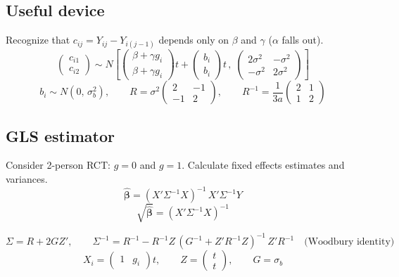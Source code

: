 \documentclass[11pt]{article}
\begin{document}
\subsection*{Useful device}

Recognize that
$c_{ij} = Y_{ij} - Y_{i(j-1)}$ depends only on
$\beta$ and $\gamma$ ($\alpha$ falls out).
\begin{equation}
  \begin{pmatrix} c_{i1} \\ c_{i2} \end{pmatrix}
  \sim N\!\left[
    \begin{pmatrix}
      \beta + \gamma g_i \\
      \beta + \gamma g_i
    \end{pmatrix} t
    + \begin{pmatrix} b_i \\ b_i \end{pmatrix} t\,,\;
    \begin{pmatrix}
      2\sigma^2 & -\sigma^2 \\
      -\sigma^2 & 2\sigma^2
    \end{pmatrix}
  \right]
\end{equation}
\[
  b_i \sim N(0,\,\sigma_b^2), \qquad
  R = \sigma^2
  \begin{pmatrix} 2 & -1 \\ -1 & 2 \end{pmatrix},
  \qquad
  R^{-1} = \frac{1}{3a}
  \begin{pmatrix} 2 & 1 \\ 1 & 2 \end{pmatrix}
\]

\subsection*{GLS estimator}

Consider 2-person RCT: $g = 0$ and $g = 1$.
Calculate fixed effects estimates and variances.
\[
  \hat{\bm{\beta}}
  = (X'\Sigma^{-1}X)^{-1}\,X'\Sigma^{-1}Y
\]
\[
  \sqrt{\hat{\bm{\beta}}} = (X'\Sigma^{-1}X)^{-1}
\]

\[
  \Sigma = R + 2GZ', \qquad
  \Sigma^{-1} = R^{-1}
    - R^{-1}Z\,(G^{-1} + Z'R^{-1}Z)^{-1}\,Z'R^{-1}
  \quad\text{(Woodbury identity)}
\]
\[
  X_i = \begin{pmatrix} 1 & g_i \end{pmatrix} t,
  \qquad
  Z = \begin{pmatrix} t \\ t \end{pmatrix},
  \qquad
  G = \sigma_b
\]
\end{document}
